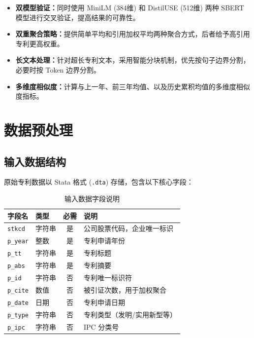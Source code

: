 \documentclass[12pt,a4paper]{article}
\theoremstyle{definition}
\begin{document}
\begin{itemize}[leftmargin=2em]
    \item \textbf{双模型验证：}同时使用 MiniLM (384维) 和 DistilUSE (512维) 两种 SBERT 模型进行交叉验证，提高结果的可靠性。
    
    \item \textbf{双重聚合策略：}提供简单平均和引用加权平均两种聚合方式，后者给予高引用专利更高权重。
    
    \item \textbf{长文本处理：}针对超长专利文本，采用智能分块机制，优先按句子边界分割，必要时按 Token 边界分割。
    
    \item \textbf{多维度相似度：}计算与上一年、前三年均值、以及历史累积均值的多维度相似度指标。
\end{itemize}

\section{数据预处理}

\subsection{输入数据结构}

原始专利数据以 Stata 格式 (\texttt{.dta}) 存储，包含以下核心字段：

\begin{table}[H]
    \centering
    \caption{输入数据字段说明}
    \label{tab:input-fields}
    \begin{tabular}{@{}llcp{6cm}@{}}
        \toprule
        \textbf{字段名} & \textbf{类型} & \textbf{必需} & \textbf{说明} \\
        \midrule
        \texttt{stkcd} & 字符串 & 是 & 公司股票代码，企业唯一标识 \\
        \texttt{p\_year} & 整数 & 是 & 专利申请年份 \\
        \texttt{p\_tt} & 字符串 & 是 & 专利标题 \\
        \texttt{p\_abs} & 字符串 & 是 & 专利摘要 \\
        \texttt{p\_id} & 字符串 & 否 & 专利唯一标识符 \\
        \texttt{p\_cite} & 数值 & 否 & 被引证次数，用于加权聚合 \\
        \texttt{p\_date} & 日期 & 否 & 专利申请日期 \\
        \texttt{p\_type} & 字符串 & 否 & 专利类型（发明/实用新型等） \\
        \texttt{p\_ipc} & 字符串 & 否 & IPC 分类号 \\
        \bottomrule
    \end{tabular}
\end{table}
\end{document}
